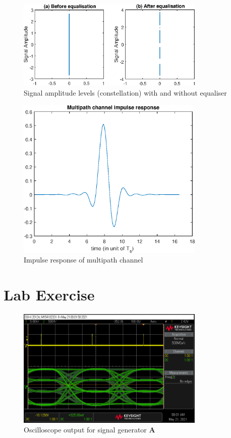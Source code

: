 \documentclass[11pt]{article}
\begin{document}
\begin{figure}[H]
    \centering
    \includegraphics[width=0.8\textwidth]{plots/constellation_eq.eps}
    \caption{Signal amplitude levels (constellation) with and without equaliser}
\end{figure}

\begin{figure}[H]
    \centering
    \includegraphics[width=0.8\textwidth]{plots/channel_impulse.eps}
    \caption{Impulse response of multipath channel}
\end{figure}




\section{Lab Exercise}
\begin{figure}[H]
    \centering
    \includegraphics[width=0.8\textwidth]{scope.png}
    \caption{Oscilloscope output for signal generator \textbf{A}\label{scope}}
\end{figure}
\end{document}
